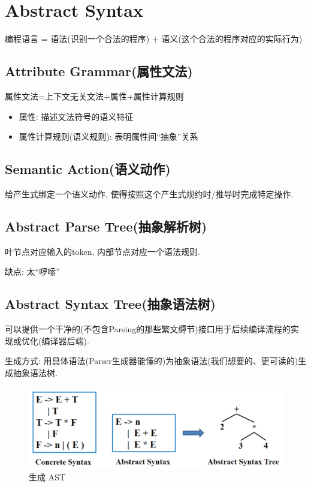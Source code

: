 \section{Abstract Syntax}
编程语言 = 语法(识别一个合法的程序) + 语义(这个合法的程序对应的实际行为)


\subsection{Attribute Grammar(属性文法)}
属性文法=上下文无关文法+属性+属性计算规则
\begin{itemize}
    \item 属性: 描述文法符号的语义特征
    \item 属性计算规则(语义规则): 表明属性间``抽象''关系
\end{itemize}

\subsection{Semantic Action(语义动作)}
给产生式绑定一个语义动作, 使得按照这个产生式规约时/推导时完成特定操作. 

\subsection{Abstract Parse Tree(抽象解析树)}
叶节点对应输入的token, 内部节点对应一个语法规则. 

缺点: 太``啰嗦''

\subsection{Abstract Syntax Tree(抽象语法树)}
可以提供一个干净的(不包含Parsing的那些繁文缛节)接口用于后续编译流程的实现或优化(编译器后端).

生成方式: 用具体语法(Parser生成器能懂的)为抽象语法(我们想要的、更可读的)生成抽象语法树.

\begin{figure}[H]
    \centering
    \includegraphics[width=0.88\linewidth]{pic/CP45/生成 AST}
    \caption{生成 AST}
\end{figure}


